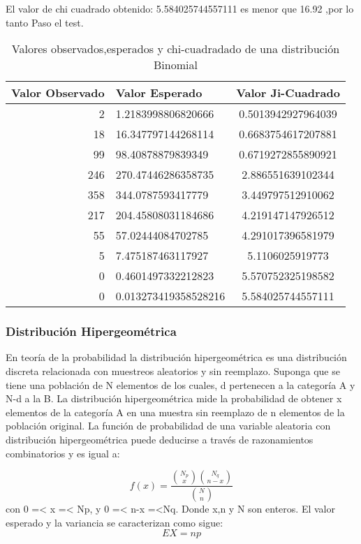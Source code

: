 \documentclass{article}
\begin{document}
  El valor de chi cuadrado obtenido: 5.584025744557111 es menor que 16.92 ,por lo tanto Paso el test.
  \begin{table}[h]
    \begin{center}
      \begin{tabular}{| r | l | c |} \hline
      Valor Observado & Valor Esperado &  Valor Ji-Cuadrado \\ \hline
      2 & 1.2183998806820666 & 0.5013942927964039 \\
      18 & 16.347797144268114 & 0.6683754617207881 \\
      99 & 98.40878879839349 & 0.6719272855890921 \\
      246 & 270.47446286358735 & 2.886551639102344 \\
      358 & 344.0787593417779 & 3.449797512910062 \\
      217 & 204.45808031184686 & 4.219147147926512 \\
      55 & 57.02444084702785 & 4.291017396581979 \\
      5 & 7.475187463117927 & 5.1106025919773 \\
      0 & 0.4601497332212823 & 5.570752325198582 \\
      0 & 0.013273419358528216 & 5.584025744557111 \\ \hline
      \end{tabular}
      \caption{Valores observados,esperados y chi-cuadradado de una distribución Binomial}
    \end{center}
  \end{table}





  \newpage
  \subsubsection{Distribución Hipergeométrica}
  En teoría de la probabilidad la distribución hipergeométrica es una distribución discreta relacionada con muestreos
  aleatorios y sin reemplazo. Suponga que se tiene una población de N elementos de los cuales, d pertenecen a la categoría
  A y N-d a la B. La distribución hipergeométrica mide la probabilidad de obtener x elementos de la categoría A en una
  muestra sin reemplazo de n elementos de la población original.
  La función de probabilidad de una variable aleatoria con distribución hipergeométrica puede deducirse a través de
  razonamientos combinatorios y es igual a:

  \begin{equation}
    f(x) = \frac{\binom{N_{p}}{x}\binom{N_{q}}{n-x}}{\binom{N}{n}}
    \end{equation}
  con 0 =< x =< Np, y 0 =< n-x =<Nq. Donde x,n y N son enteros. El valor esperado y la variancia se caracterizan como sigue:
  \begin{equation}
    EX = np
    \end{equation}
\end{document}
